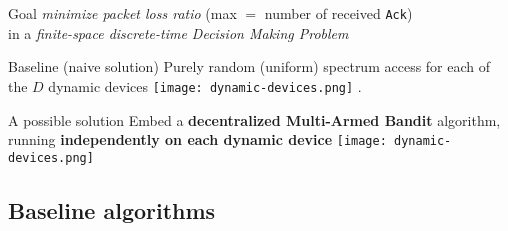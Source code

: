 \begin{frameO}[Problem]

    \begin{lightblock}{Goal}
        \emph{minimize packet loss ratio} (max \(=\) number of received \texttt{Ack})\\
        in a \emph{finite-space discrete-time Decision Making Problem}
    \end{lightblock}

    \vspace*{20pt}

    \begin{lightblock}{Baseline (naive solution)}
        Purely random (uniform) spectrum access for each of the $D$ dynamic devices \texttt{[image: dynamic-devices.png]} .
    \end{lightblock}

    \begin{lightblock}{A possible solution}
        Embed a \textbf{decentralized Multi-Armed Bandit} algorithm, running \textbf{independently on each dynamic device} \texttt{[image: dynamic-devices.png]}
    \end{lightblock}

\end{frameO}



\subsection{Baseline algorithms}





